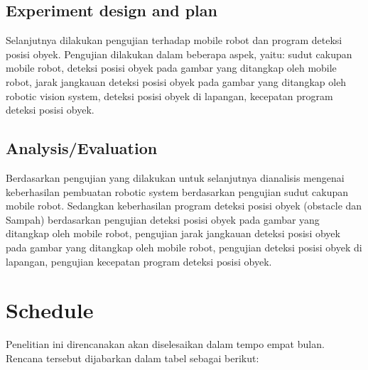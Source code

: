 \subsection{Experiment design and plan}
Selanjutnya dilakukan pengujian terhadap mobile robot dan program deteksi posisi obyek. Pengujian dilakukan dalam beberapa aspek, yaitu: sudut cakupan mobile robot, deteksi posisi obyek pada gambar yang ditangkap oleh mobile robot, jarak jangkauan deteksi posisi obyek pada gambar yang ditangkap oleh robotic vision system, deteksi posisi obyek di lapangan, kecepatan program deteksi posisi obyek.

\subsection{Analysis/Evaluation}
Berdasarkan pengujian yang dilakukan untuk selanjutnya dianalisis mengenai keberhasilan pembuatan robotic  system berdasarkan pengujian sudut cakupan mobile robot. Sedangkan keberhasilan program deteksi posisi obyek (obstacle dan Sampah) berdasarkan pengujian deteksi posisi obyek pada gambar yang ditangkap oleh mobile robot, pengujian jarak jangkauan deteksi posisi obyek pada gambar yang ditangkap oleh mobile robot, pengujian deteksi posisi obyek di lapangan, pengujian kecepatan program deteksi posisi obyek.

\section{Schedule}


Penelitian ini direncanakan akan diselesaikan dalam tempo empat bulan. Rencana tersebut dijabarkan dalam tabel sebagai berikut:








